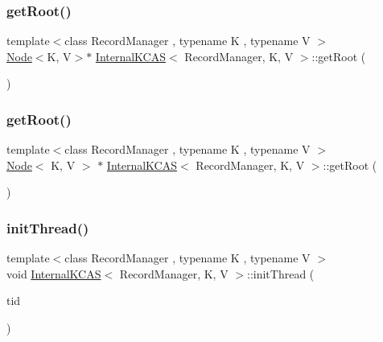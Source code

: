 \mbox{\label{classInternalKCAS_a4b6e760af14cd473618fcc12baf18d6d}} 
\subsubsection{\texorpdfstring{get\+Root()}{getRoot()}\hspace{0.1cm}{\footnotesize\ttfamily [1/2]}}
{\footnotesize\ttfamily template$<$class Record\+Manager , typename K , typename V $>$ \\
\hyperlink{classNode}{Node}$<$K, V$>$$\ast$ \hyperlink{classInternalKCAS}{Internal\+K\+C\+AS}$<$ Record\+Manager, K, V $>$\+::get\+Root (\begin{DoxyParamCaption}{ }\end{DoxyParamCaption})}

\mbox{\label{classInternalKCAS_af0b27ea462939a6e491e0775f4ab0b9e}} 
\subsubsection{\texorpdfstring{get\+Root()}{getRoot()}\hspace{0.1cm}{\footnotesize\ttfamily [2/2]}}
{\footnotesize\ttfamily template$<$class Record\+Manager , typename K , typename V $>$ \\
\hyperlink{classNode}{Node}$<$ K, V $>$ $\ast$ \hyperlink{classInternalKCAS}{Internal\+K\+C\+AS}$<$ Record\+Manager, K, V $>$\+::get\+Root (\begin{DoxyParamCaption}\item[{void}]{ }\end{DoxyParamCaption})\hspace{0.3cm}{\ttfamily [inline]}}

\mbox{\label{classInternalKCAS_ab4fe3ffb3c0839a75a9a4272750d10e4}} 
\subsubsection{\texorpdfstring{init\+Thread()}{initThread()}\hspace{0.1cm}{\footnotesize\ttfamily [1/2]}}
{\footnotesize\ttfamily template$<$class Record\+Manager , typename K , typename V $>$ \\
void \hyperlink{classInternalKCAS}{Internal\+K\+C\+AS}$<$ Record\+Manager, K, V $>$\+::init\+Thread (\begin{DoxyParamCaption}\item[{const int}]{tid }\end{DoxyParamCaption})}


